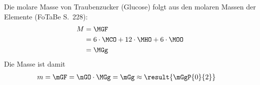 Die molare Masse von Traubenzucker (Glucose) folgt aus den molaren Massen der Elemente (FoTaBe S.~228):
\begin{align}
 M &= \MGF \\
   &= 6\cdot\MCO + 12\cdot\MHO + 6\cdot\MOO \\
   &= \MGg
\end{align}
Die Masse ist damit
\begin{align}
 m &= \mGF = \nGO\cdot\MGg = \mGg \approx \result{\mGgP{0}{2}}
\end{align}
